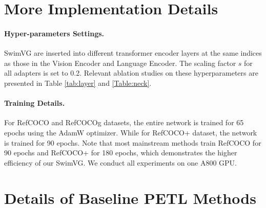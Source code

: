 \section{More Implementation Details}
\label{sec:more imple}

\paragraph{Hyper-parameters Settings.} SwimVG are inserted into different transformer encoder layers at the same indices as those in the Vision Encoder and Language Encoder. The scaling factor $s$ for all adapters is set to 0.2. Relevant ablation studies on these hyperparameters are presented in Table \ref{tab:layer} and \ref{Table:neck}.  


\paragraph{Training Details.} For RefCOCO \cite{yu2016refcoco} and RefCOCOg \cite{mao2016refcocogg,nagaraja2016refcocogu} datasets, the entire network is trained for 65 epochs using the AdamW optimizer. While for RefCOCO+ \cite{yu2016refcoco} dataset, the network is trained for 90 epochs. Note that most mainstream methods train RefCOCO for 90 epochs and RefCOCO+ for 180 epochs, which demonstrates the higher efficiency of our SwimVG. We conduct all experiments on one A800 GPU.


\section{Details of Baseline PETL Methods}
\label{sec:details of baseline petl}


